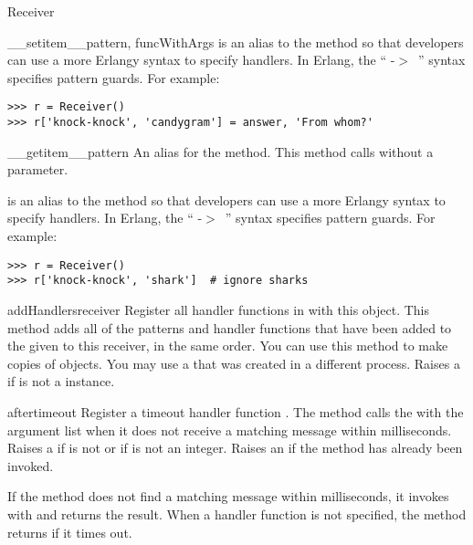 \documentclass{howto}
\newcommand{\greaterthan}[0]{\begin{math}>\end{math}}
\newcommand{\greaterthan}[0]{>}
\begin{document}
\begin{classdesc}{Receiver}{}
\begin{methoddesc}{__setitem__}{pattern, funcWithArgs}
 is an alias to the  method so that
developers can use a more Erlangy syntax to specify handlers. In Erlang, the
`` -\greaterthan\ '' syntax specifies pattern guards. For
example:
\begin{verbatim}
>>> r = Receiver()
>>> r['knock-knock', 'candygram'] = answer, 'From whom?'
\end{verbatim}
\end{methoddesc}

\begin{methoddesc}{__getitem__}{pattern}
\opindex{[]}
An alias for the  method. This method calls
 without a  parameter.

 is an alias to the  method so that
developers can use a more Erlangy syntax to specify handlers. In Erlang, the
`` -\greaterthan\ '' syntax specifies pattern guards. For
example:
\begin{verbatim}
>>> r = Receiver()
>>> r['knock-knock', 'shark']  # ignore sharks
\end{verbatim}
\end{methoddesc}

\begin{methoddesc}{addHandlers}{receiver}
Register all handler functions in  with this 
object. This method adds all of the patterns and handler functions that have
been added to the given  to this receiver, in the same order. You
can use this method to make copies of  objects. You may use a
 that was created in a different process. Raises a 
 if  is not a  instance.
\end{methoddesc}

\begin{methoddesc}{after}{timeout}
Register a timeout handler function . The  method
calls the  with the  argument list when it does not receive
a matching message within  milliseconds. Raises a 
 if  is not  or if
 is not an integer. Raises an  if the
 method has already been invoked.

If the  method does not find a matching message within
 milliseconds, it invokes  with  and returns
the result. When a handler function  is not specified, the
 method returns  if it times out.


\end{methoddesc}
\end{classdesc}
\end{document}
